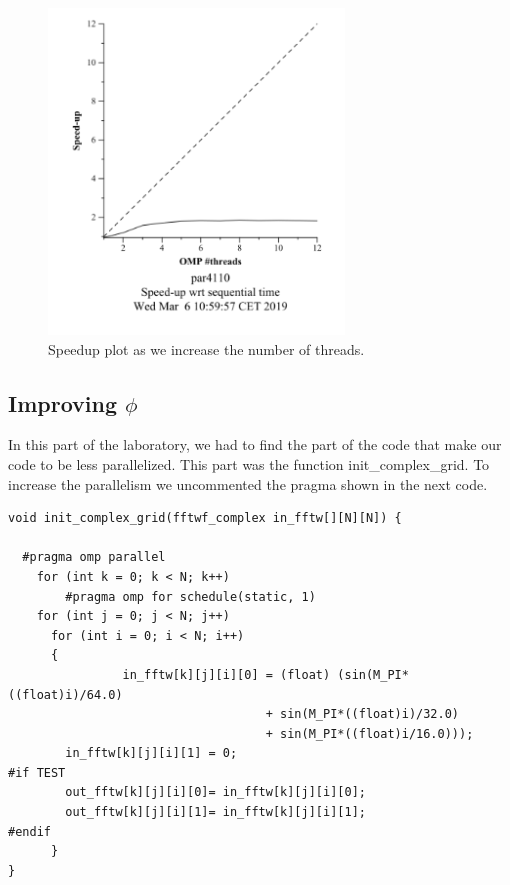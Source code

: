 \documentclass[12pt, a4paper]{article}
\begin{document}
\begin{figure}[H]
\begin{minipage}[b]{0.45\linewidth}
\includegraphics[width=\textwidth]{./images/speed_v0}

\caption{Speedup plot as we increase the number of threads.}
\label{fig:speed_v0}
\end{minipage}
\end{figure}

\subsection{Improving $\phi$}

In this part of the laboratory, we had to find the part of the code that make our code to be less parallelized. This part was the function init\_complex\_grid. To increase the parallelism we uncommented the pragma shown in the next code.

\begin{lstlisting}
void init_complex_grid(fftwf_complex in_fftw[][N][N]) {

  #pragma omp parallel
	for (int k = 0; k < N; k++) 
		#pragma omp for schedule(static, 1)
    for (int j = 0; j < N; j++)
      for (int i = 0; i < N; i++)
      {
				in_fftw[k][j][i][0] = (float) (sin(M_PI*((float)i)/64.0)
									+ sin(M_PI*((float)i)/32.0)
									+ sin(M_PI*((float)i/16.0)));
        in_fftw[k][j][i][1] = 0;
#if TEST
        out_fftw[k][j][i][0]= in_fftw[k][j][i][0];
        out_fftw[k][j][i][1]= in_fftw[k][j][i][1];
#endif
      }
}
\end{lstlisting}
\end{document}
